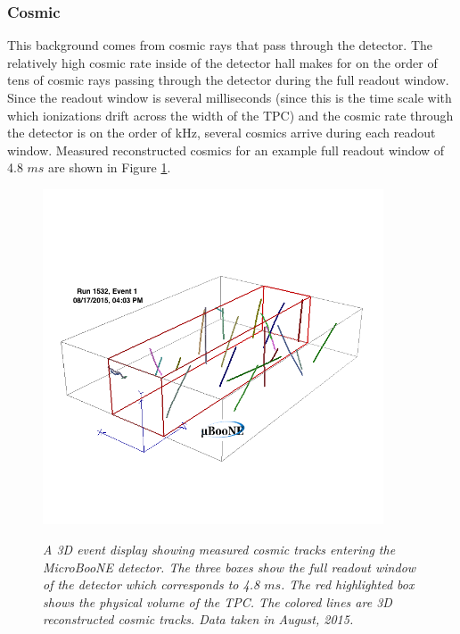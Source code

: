 \subsubsection{Cosmic}
This background comes from cosmic rays that pass through the detector. The relatively high cosmic rate inside of the detector hall makes for on the order of tens of cosmic rays passing through the detector during the full readout window. Since the readout window is several milliseconds (since this is the time scale with which ionizations drift across the width of the TPC) and the cosmic rate through the detector is on the order of kHz, several cosmics arrive during each readout window. Measured reconstructed cosmics for an example full readout window of 4.8 $ms$ are shown in Figure \ref{UB_publicplot_3dcosmics}.\\


\begin{figure}[ht!]
\centering
\includegraphics[width=0.9\textwidth]{Figures/UB_publicplot_3dcosmics.png}\\
\caption{\textit{A 3D event display showing measured cosmic tracks entering the MicroBooNE detector. The three boxes show the full readout window of the detector which corresponds to 4.8 $ms$. The red highlighted box shows the physical volume of the TPC. The colored lines are 3D reconstructed cosmic tracks. Data taken in August, 2015.}}
\label{UB_publicplot_3dcosmics}
\end{figure}


